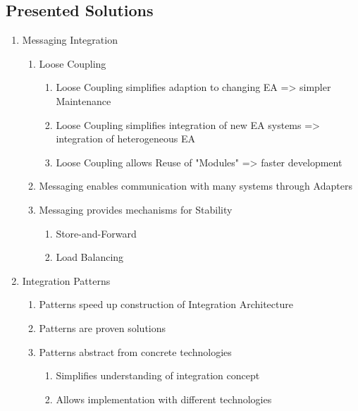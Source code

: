 \documentclass[
     12pt,         %
     a4paper,      %
     BCOR10mm,     %
     DIV14,        %
     ]{scrreprt}
\begin{document}
\subsection{Presented Solutions}
\begin{enumerate}
     \item Messaging Integration
           \begin{enumerate}
                \item Loose Coupling
                      \begin{enumerate}
                           \item Loose Coupling simplifies adaption to changing EA => simpler Maintenance
                           \item Loose Coupling simplifies integration of new EA systems => integration of heterogeneous EA
                           \item Loose Coupling allows Reuse of "Modules" => faster development
                      \end{enumerate}

                \item Messaging enables communication with many systems through Adapters

                \item Messaging provides mechanisms for Stability
                      \begin{enumerate}
                           \item Store-and-Forward
                           \item Load Balancing
                      \end{enumerate}

           \end{enumerate}

     \item Integration Patterns
           \begin{enumerate}
                \item Patterns speed up construction of Integration Architecture
                \item Patterns are proven solutions
                \item Patterns abstract from concrete technologies
                      \begin{enumerate}
                           \item Simplifies understanding of integration concept
                           \item Allows implementation with different technologies
                      \end{enumerate}

           \end{enumerate}

\end{enumerate}
\end{document}
